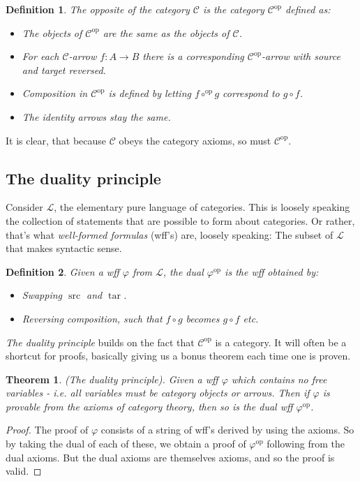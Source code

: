 \documentclass[12pt, a4paper]{article}
\newtheorem{theorem}{Theorem}[section]
\newtheorem{definition}{Definition}[section]
\numberwithin{equation}{section}
\DeclareMathOperator{\src}{src}
\DeclareMathOperator{\tar}{tar}
\begin{document}
\begin{definition}
The opposite of the category $\mathcal{C}$ is the category $\mathcal{C}^{\textrm{op}}$ defined as:
\begin{itemize}
\item The objects of $\mathcal{C}^{\textrm{op}}$ are the same as the objects of $\mathcal{C}$.
\item For each $\mathcal{C}$-arrow $f: A\rightarrow B$ there is a corresponding $\mathcal{C}^{\textrm{op}}$-arrow with source and target reversed.
\item Composition in $\mathcal{C}^{\textrm{op}}$ is defined by letting $f\circ^{\textrm{op}}g$ correspond to $g\circ f$.
\item The identity arrows stay the same.
\end{itemize}
\end{definition}

It is clear, that because $\mathcal{C}$ obeys the category axioms, so must $\mathcal{C}^{\textrm{op}}$.

\subsection{The duality principle}
Consider $\mathcal{L}$, the elementary pure language of categories. This is loosely speaking the collection of statements that are possible to form about categories. Or rather, that's what \textit{well-formed formulas} (wff's) are, loosely speaking: The subset of $\mathcal{L}$ that makes syntactic sense.

\begin{definition}
Given a wff $\varphi$ from $\mathcal{L}$, the dual $\varphi^{\textrm{op}}$ is the wff obtained by:
\begin{itemize}
\item Swapping $\src$ and $\tar$.
\item Reversing composition, such that $f\circ g$ becomes $g\circ f$ etc.
\end{itemize}
\end{definition}

\textit{The duality principle} builds on the fact that $\mathcal{C}^{\textrm{op}}$ is a category. It will often be a shortcut for proofs, basically giving us a bonus theorem each time one is proven.

\begin{theorem}
(The duality principle). Given a wff $\varphi$ which contains no free variables - i.e. all variables must be category objects or arrows. Then if $\varphi$ is provable from the axioms of category theory, then so is the dual wff $\varphi^{\textrm{op}}$.
\end{theorem}
\begin{proof}
The proof of $\varphi$ consists of a string of wff's derived by using the axioms. So by taking the dual of each of these, we obtain a proof of $\varphi^{\textrm{op}}$ following from the dual axioms. But the dual axioms are themselves axioms, and so the proof is valid.
\end{proof}
\end{document}
